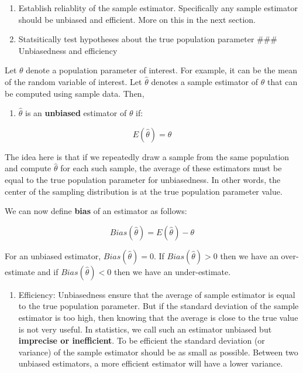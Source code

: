 \documentclass[
]{book}
\providecommand{\tightlist}{%
  \setlength{\itemsep}{0pt}\setlength{\parskip}{0pt}}
\theoremstyle{definition}
\theoremstyle{definition}
\theoremstyle{definition}
\theoremstyle{definition}
\theoremstyle{remark}
\begin{document}
\begin{enumerate}
  \begin{enumerate}
  \def\labelenumii{\alph{enumii}.}
  \tightlist
  \item
    Establish reliablity of the sample estimator. Specifically any sample estimator should be unbiased and efficient. More on this in the next section.
  \item
    Statsitically test hypotheses about the true population parameter
    \#\#\# Unbiasedness and efficiency
  \end{enumerate}
\end{enumerate}

Let \(\theta\) denote a population parameter of interest. For example, it can be the mean of the random variable of interest. Let \(\widehat{\theta}\) denotes a sample estimator of \(\theta\) that can be computed using sample data. Then,

\begin{enumerate}
\def\labelenumi{\arabic{enumi}.}
\tightlist
\item
  \(\widehat{\theta}\) is an \textbf{unbiased} estimator of \(\theta\) if:
\end{enumerate}

\[E(\widehat{\theta})=\theta\]

The idea here is that if we repeatedly draw a sample from the same population and compute \(\widehat{\theta}\) for each such sample, the average of these estimators must be equal to the true population parameter for unbiasedness. In other words, the center of the sampling distribution is at the true population parameter value.

We can now define \textbf{bias} of an estimator as follows:

\[Bias(\widehat{\theta}) = E(\widehat{\theta})-\theta\]

For an unbiased estimator, \(Bias(\widehat{\theta})=0\). If \(Bias(\widehat{\theta})>0\) then we have an over-estimate and if \(Bias(\widehat{\theta})<0\) then we have an under-estimate.

\begin{enumerate}
\def\labelenumi{\arabic{enumi}.}
\setcounter{enumi}{1}
\tightlist
\item
  Efficiency: Unbiasedness ensure that the average of sample estimator is equal to the true population parameter. But if the standard deviation of the sample estimator is too high, then knowing that the average is close to the true value is not very useful. In statistics, we call such an estimator unbiased but \textbf{imprecise or inefficient}. To be efficient the standard deviation (or variance) of the sample estimator should be as small as possible. Between two unbiased estimators, a more efficient estimator will have a lower variance.
\end{enumerate}
\end{document}

